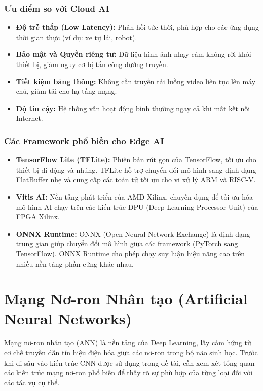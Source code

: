 \subsubsection{Ưu điểm so với Cloud AI}
\begin{itemize}
    \item \textbf{Độ trễ thấp (Low Latency):} Phản hồi tức thời, phù hợp cho các ứng dụng thời gian thực (ví dụ: xe tự lái, robot).
    \item \textbf{Bảo mật và Quyền riêng tư:} Dữ liệu hình ảnh nhạy cảm không rời khỏi thiết bị, giảm nguy cơ bị tấn công đường truyền.
    \item \textbf{Tiết kiệm băng thông:} Không cần truyền tải luồng video liên tục lên máy chủ, giảm tải cho hạ tầng mạng.
    \item \textbf{Độ tin cậy:} Hệ thống vẫn hoạt động bình thường ngay cả khi mất kết nối Internet.
\end{itemize}

\subsubsection{Các Framework phổ biến cho Edge AI}
\begin{itemize}
    \item \textbf{TensorFlow Lite (TFLite):} Phiên bản rút gọn của TensorFlow, tối ưu cho thiết bị di động và nhúng. TFLite hỗ trợ chuyển đổi mô hình sang định dạng FlatBuffer nhẹ và cung cấp các toán tử tối ưu cho vi xử lý ARM và RISC-V.
    \item \textbf{Vitis AI:} Nền tảng phát triển của AMD-Xilinx, chuyên dụng để tối ưu hóa mô hình AI chạy trên các kiến trúc DPU (Deep Learning Processor Unit) của FPGA Xilinx.
    \item \textbf{ONNX Runtime:} ONNX (Open Neural Network Exchange) là định dạng trung gian giúp chuyển đổi mô hình giữa các framework (PyTorch sang TensorFlow). ONNX Runtime cho phép chạy suy luận hiệu năng cao trên nhiều nền tảng phần cứng khác nhau.
\end{itemize}

\section{Mạng Nơ-ron Nhân tạo (Artificial Neural Networks)}
\label{sec:neural_network}

Mạng nơ-ron nhân tạo (ANN) là nền tảng của Deep Learning, 
lấy cảm hứng từ cơ chế truyền dẫn tín hiệu điện hóa giữa các nơ-ron 
trong bộ não sinh học. Trước khi đi sâu vào kiến trúc CNN được sử dụng trong đề tài, 
cần xem xét tổng quan các kiến trúc mạng nơ-ron phổ biến để thấy rõ sự phù hợp 
của từng loại đối với các tác vụ cụ thể.\cite{CNN}

